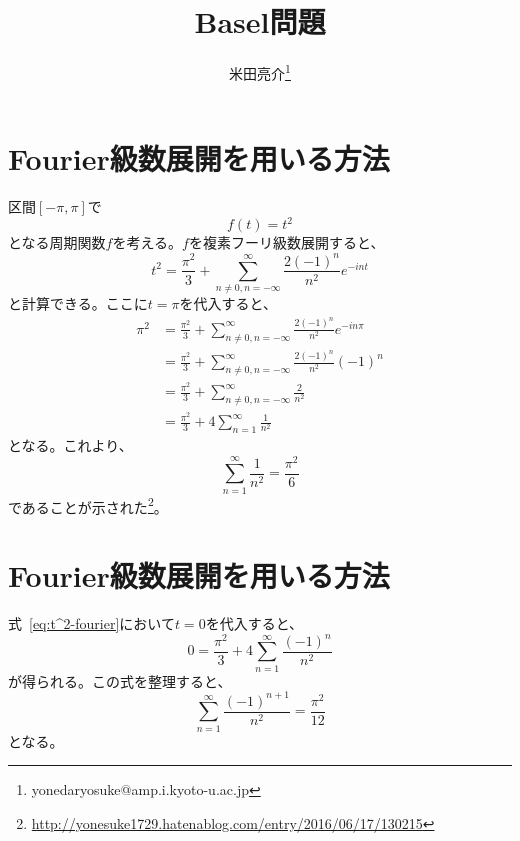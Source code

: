 \documentclass{jsarticle}
\title{Basel問題}
\author{米田亮介\footnote{yonedaryosuke@amp.i.kyoto-u.ac.jp}}
\begin{document}
\maketitle


\tableofcontents

\newpage

\section{Fourier級数展開を用いる方法}
区間$[-\pi,\pi]$で
\begin{equation}
	f(t)=t^{2}
\end{equation}
となる周期関数$f$を考える。$f$を複素フーリ級数展開すると、
\begin{equation}
	t^{2}=\frac{\pi^{2}}{3}+\sum_{n\ne 0,n=-\infty}^{\infty}\frac{2(-1)^{n}}{n^{2}}e^{-int}
	\label{eq:t^2-fourier}
\end{equation}
と計算できる。ここに$t=\pi$を代入すると、
\begin{align}
	\pi^{2}&=\frac{\pi^{2}}{3}+\sum_{n\ne 0,n=-\infty}^{\infty}\frac{2(-1)^{n}}{n^{2}}e^{-in\pi}\\
	&=\frac{\pi^{2}}{3}+\sum_{n\ne 0,n=-\infty}^{\infty}\frac{2(-1)^{n}}{n^{2}}(-1)^{n}\\
	&=\frac{\pi^{2}}{3}+\sum_{n\ne 0,n=-\infty}^{\infty}\frac{2}{n^{2}}\\
	&=\frac{\pi^{2}}{3}+4\sum_{n=1}^{\infty}\frac{1}{n^{2}}
\end{align}
となる。これより、
\begin{equation}
	\sum_{n=1}^{\infty}\frac{1}{n^{2}}=\frac{\pi^{2}}{6}
\end{equation}
であることが示された\footnote{\url{http://yonesuke1729.hatenablog.com/entry/2016/06/17/130215}}。

\newpage

\section{Fourier級数展開を用いる方法}
式~\eqref{eq:t^2-fourier}において$t=0$を代入すると、
\begin{equation}
	0=\frac{\pi^{2}}{3}+4\sum_{n=1}^{\infty}\frac{(-1)^{n}}{n^{2}}
\end{equation}
が得られる。この式を整理すると、
\begin{equation}
	\sum_{n=1}^{\infty}\frac{(-1)^{n+1}}{n^{2}}=\frac{\pi^{2}}{12}
\end{equation}
となる。
\end{document}
